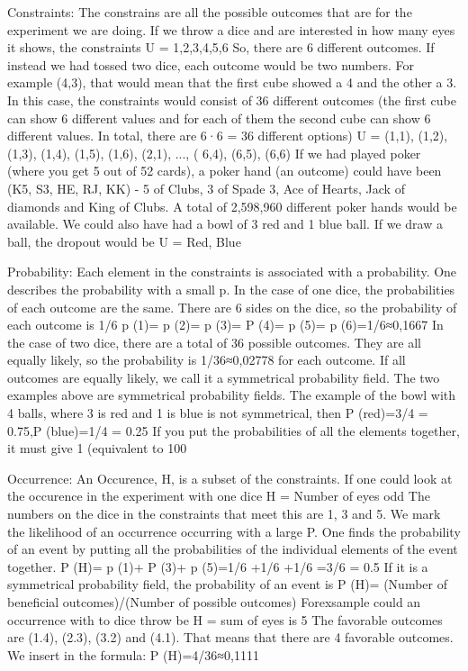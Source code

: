 Constraints:
The constrains are all the possible outcomes that are for the experiment we are doing. If we throw a dice and are interested in how many eyes it shows, the constraints
U = {1,2,3,4,5,6}
So, there are 6 different outcomes.
If instead we had tossed two dice, each outcome would be two numbers. For example (4,3), that would mean that the first cube showed a 4 and the other a 3. In this case, the constraints would consist of 36 different outcomes (the first cube can show 6 different values and for each of them the second cube can show 6 different values. In total, there are 6·6 = 36 different options)
U = {(1,1), (1,2), (1,3), (1,4), (1,5), (1,6), (2,1), ..., ( 6,4), (6,5), (6,6)}
If we had played poker (where you get 5 out of 52 cards), a poker hand (an outcome) could have been (K5, S3, HE, RJ, KK) -  5 of Clubs, 3 of Spade 3, Ace of Hearts, Jack of diamonds and King of Clubs. A total of 2,598,960 different poker hands would be available. 
We could also have had a bowl of 3 red and 1 blue ball. If we draw a ball, the dropout would be
U = {Red, Blue}

Probability:
Each element in the constraints is associated with a probability. One describes the probability with a small p.
In the case of one dice, the probabilities of each outcome are the same. There are 6 sides on the dice, so the probability of each outcome is 1/6
p (1)= p (2)= p (3)= P (4)= p (5)= p (6)=1/6≈0,1667
In the case of two dice, there are a total of 36 possible outcomes. They are all equally likely, so the probability is
1/36≈0,02778
for each outcome.
If all outcomes are equally likely, we call it a symmetrical probability field. The two examples above are symmetrical probability fields. 
The example of the bowl with 4 balls, where 3 is red and 1 is blue is not symmetrical, then
P (red)=3/4  = 0.75,P (blue)=1/4  = 0.25
If you put the probabilities of all the elements together, it must give 1 (equivalent to 100%

Occurrence:
An Occurence, H, is a subset of the constraints. If one could look at the occurence in the experiment with one dice
H = {Number of eyes odd}
The numbers on the dice in the constraints that meet this are 1, 3 and 5.
We mark the likelihood of an occurrence occurring with a large P. One finds the probability of an event by putting all the probabilities of the individual elements of the event together.
P (H)= p (1)+ P (3)+ p (5)=1/6  +1/6  +1/6  =3/6  = 0.5
If it is a symmetrical probability field, the probability of an event is
P (H)=  (Number of beneficial outcomes)/(Number of possible outcomes)
Forexsample could an occurrence with to dice throw be
H = {sum of eyes is 5}
The favorable outcomes are (1.4), (2.3), (3.2) and (4.1). That means that there are 4 favorable outcomes. We insert in the formula:
P (H)=4/36≈0,1111


